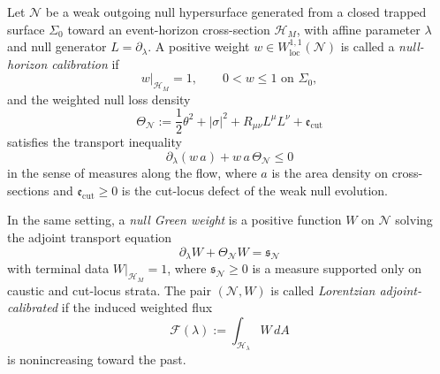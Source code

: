 \begin{definition}\label{def:NullHorizonCalibration}
Let $\mathcal N$ be a weak outgoing null hypersurface generated from a closed trapped surface $\Sigma_0$ toward an event-horizon cross-section $\mathcal H_M$, with affine parameter $\lambda$ and null generator $L=\partial_\lambda$. A positive weight $w\in W^{1,1}_{\mathrm{loc}}(\mathcal N)$ is called a \emph{null-horizon calibration} if
\[
    w|_{\mathcal H_M}=1,\qquad 0<w\le 1 \text{ on }\Sigma_0,
\]
and the weighted null loss density
\[
    \Theta_{\mathcal N}
    :=
    \frac12\theta^2+|\sigma|^2+R_{\mu\nu}L^\mu L^\nu+\mathfrak e_{\mathrm{cut}}
\]
satisfies the transport inequality
\begin{equation}\label{eq:NullCalibrationTransport}
    \partial_\lambda(w\,a)+w\,a\,\Theta_{\mathcal N}\le 0
\end{equation}
in the sense of measures along the flow, where $a$ is the area density on cross-sections and $\mathfrak e_{\mathrm{cut}}\ge0$ is the cut-locus defect of the weak null evolution.
\end{definition}

\begin{definition}\label{def:NullGreenWeight}
In the same setting, a \emph{null Green weight} is a positive function $W$ on $\mathcal N$ solving the adjoint transport equation
\begin{equation}\label{eq:NullGreenAdjoint}
    \partial_\lambda W + \Theta_{\mathcal N}W = \mathfrak s_{\mathcal N}
\end{equation}
with terminal data $W|_{\mathcal H_M}=1$, where $\mathfrak s_{\mathcal N}\ge0$ is a measure supported only on caustic and cut-locus strata. The pair $(\mathcal N,W)$ is called \emph{Lorentzian adjoint-calibrated} if the induced weighted flux
\[
    \mathcal F(\lambda):=\int_{\mathcal H_\lambda} W\,dA
\]
is nonincreasing toward the past.
\end{definition}

